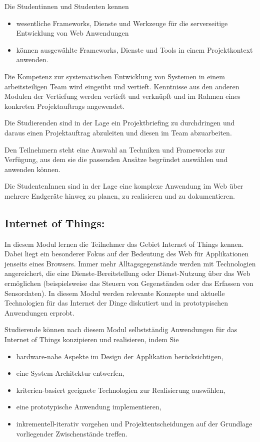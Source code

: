 Die Studentinnen und Studenten kennen

\begin{itemize}
\tightlist
\item
  wesentliche Frameworks, Dienste und Werkzeuge für die serverseitige
  Entwicklung von Web Anwendungen
\item
  können ausgewählte Frameworks, Dienste und Tools in einem
  Projektkontext anwenden.
\end{itemize}

Die Kompetenz zur systematischen Entwicklung von Systemen in einem
arbeitsteiligen Team wird eingeübt und vertieft. Kenntnisse aus den
anderen Modulen der Vertiefung werden vertieft und verknüpft und im
Rahmen eines konkreten Projektauftrags angewendet.

Die Studierenden sind in der Lage ein Projektbriefing zu durchdringen
und daraus einen Projektauftrag abzuleiten und diesen im Team
abzuarbeiten.

Den Teilnehmern steht eine Auswahl an Techniken und Frameworks zur
Verfügung, aus dem sie die passenden Ansätze begründet auswählen und
anwenden können.

Die StudentenInnen sind in der Lage eine komplexe Anwendung im Web über
mehrere Endgeräte hinweg zu planen, zu realisieren und zu dokumentieren.

\subsection*{Internet of Things:}\label{internet-of-things}

In diesem Modul lernen die Teilnehmer das Gebiet Internet of Things
kennen. Dabei liegt ein besonderer Fokus auf der Bedeutung des Web für
Applikationen jenseits eines Browsers. Immer mehr Alltagsgegenstände
werden mit Technologien angereichert, die eine Dienste-Bereitstellung
oder Dienst-Nutzung über das Web ermöglichen (beispielsweise das Steuern
von Gegenständen oder das Erfassen von Sensordaten). In diesem Modul
werden relevante Konzepte und aktuelle Technologien für das Internet der
Dinge diskutiert und in prototypischen Anwendungen erprobt.

Studierende können nach diesem Modul selbstständig Anwendungen für das
Internet of Things konzipieren und realisieren, indem Sie

\begin{itemize}
\tightlist
\item
  hardware-nahe Aspekte im Design der Applikation berücksichtigen,
\item
  eine System-Architektur entwerfen,
\item
  kriterien-basiert geeignete Technologien zur Realisierung auswählen,
\item
  eine prototypische Anwendung implementieren,
\item
  inkrementell-iterativ vorgehen und Projektentscheidungen auf der
  Grundlage vorliegender Zwischenstände treffen.
\end{itemize}


